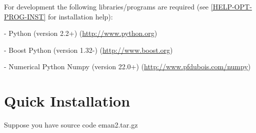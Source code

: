     For development the following libraries/programs are required (see
    \ref{HELP-OPT-PROG-INST} for installation help):

    - Python (version 2.2+)     (\href{http://www.python.org}{http://www.python.org})
    
    - Boost Python (version 1.32-)	(\href{http://www.boost.org}{http://www.boost.org})
    
    - Numerical Python Numpy (version 22.0+)
                                        (\href{http://www.pfdubois.com/numpy}{http://www.pfdubois.com/numpy})



\section{Quick Installation} 
\label{QUICK-INSTALLATION} 

 Suppose you have source code eman2.tar.gz

